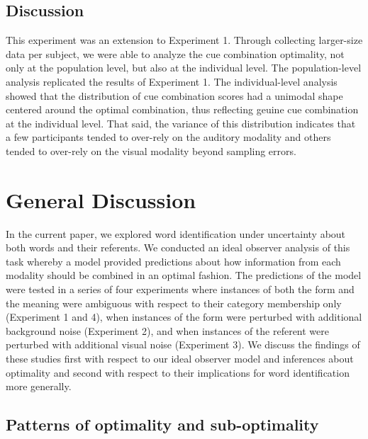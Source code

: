 \documentclass[english,,man,floatsintext]{apa6}
\theoremstyle{definition}
\theoremstyle{definition}
\theoremstyle{definition}
\theoremstyle{remark}
\begin{document}
\subsection{Discussion}\label{discussion-3}

This experiment was an extension to Experiment 1. Through collecting
larger-size data per subject, we were able to analyze the cue
combination optimality, not only at the population level, but also at
the individual level. The population-level analysis replicated the
results of Experiment 1. The individual-level analysis showed that the
distribution of cue combination scores had a unimodal shape centered
around the optimal combination, thus reflecting geuine cue combination
at the individual level. That said, the variance of this distribution
indicates that a few participants tended to over-rely on the auditory
modality and others tended to over-rely on the visual modality beyond
sampling errors.

\section{General Discussion}\label{general-discussion}

In the current paper, we explored word identification under uncertainty
about both words and their referents. We conducted an ideal observer
analysis of this task whereby a model provided predictions about how
information from each modality should be combined in an optimal fashion.
The predictions of the model were tested in a series of four experiments
where instances of both the form and the meaning were ambiguous with
respect to their category membership only (Experiment 1 and 4), when
instances of the form were perturbed with additional background noise
(Experiment 2), and when instances of the referent were perturbed with
additional visual noise (Experiment 3). We discuss the findings of these
studies first with respect to our ideal observer model and inferences
about optimality and second with respect to their implications for word
identification more generally.

\subsection{Patterns of optimality and
sub-optimality}\label{patterns-of-optimality-and-sub-optimality}
\end{document}
